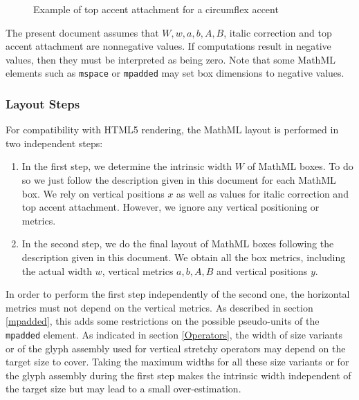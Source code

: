 \begin{figure}
\centering
\caption{Example of top accent attachment for a circumflex accent}
\label{fig:TopAccentAttachment}
\end{figure}

The present document assumes that $W,w,a,b,A,B$, italic correction
and top accent attachment are nonnegative values. If computations result
in negative values, then they must be interpreted as being zero.
Note that some MathML elements such as {\tt mspace} or {\tt mpadded} may set box
dimensions to negative values.

\subsubsection{Layout Steps}\label{LayoutSteps}

For compatibility with HTML5 rendering, the MathML layout is performed in two
independent steps:

\begin{enumerate}
\item In the first step, we determine the intrinsic width $W$ of MathML boxes.
  To do so we just follow the description given in this document for each
  MathML box. We rely on vertical positions $x$ as well as values for
  italic correction and top accent attachment. However, we ignore any vertical
  positioning or metrics.
\item In the second step, we do the final layout of MathML boxes following
  the description given in this document. We obtain all the box metrics,
  including the actual width $w$, vertical metrics $a,b,A,B$ and
  vertical positions $y$.
\end{enumerate}

In order to perform the first step independently of the second one, the
horizontal metrics must not depend on the vertical metrics. As described in
section \ref{mpadded}, this adds some restrictions on the possible pseudo-units
of the {\tt mpadded} element. As indicated in section \ref{Operators},
the width of size variants or of the glyph assembly used for vertical stretchy
operators may depend on the target size to cover. Taking the maximum widths
for all these size variants or for the glyph assembly during the first step
makes the intrinsic width independent of the target size but may lead to a
small over-estimation.

